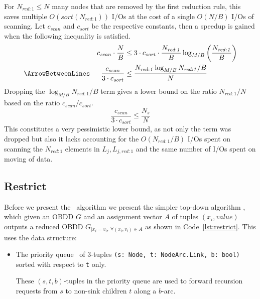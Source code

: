 For $N_{\mathit{red}:1} \leq N$ many nodes that are removed by the first
reduction rule, this saves multiple $O(sort(N_{\mathit{red:1}}))$ I/Os at the
cost of a single $O(N/B)$ I/Os of scanning. Let $c_{\mathit{scan}}$ and
$c_{\mathit{sort}}$ be the respective constants, then a speedup is gained when
the following inequality is satisfied.
\begin{alignat*}{2}
  &&c_{\mathit{scan}} \cdot \frac{N}{B}
  & \leq 3 \cdot c_{\mathit{sort}} \cdot \frac{N_{\mathit{red:1}}}{B}
           \log_{M/B} \left( \frac{N_{\mathit{red:1}}}{B} \right)
  \\ \ArrowBetweenLines
  &&\frac{c_{\mathit{scan}}}{3 \cdot c_{\mathit{sort}}}
  & \leq \frac{N_{\mathit{red:1}} \log_{M/B} N_{\mathit{red:1}} / B}{N}
\end{alignat*}
Dropping the $\log_{M/B} N_{\mathit{red:1}} / B$ term gives a lower bound on the
ratio $N_{\mathit{red:1}} / N$ based on the ratio $c_{\mathit{scan}} /
c_{\mathit{sort}}$.
\begin{equation}
    \frac{c_{\mathit{scan}}}{3 \cdot c_{\mathit{sort}}} \leq \frac{N_s}{N}
\end{equation}
This constitutes a very pessimistic lower bound, as not only the term was
dropped but also it lacks accounting for the $O(N_{\mathit{red:1}} / B)$ I/Os
spent on scanning the $N_{\mathit{red:1}}$ elements in $L_j,
L_{j,\mathit{red:1}}$ and the same number of I/Os spent on moving of data.


\clearpage
\subsection{Restrict} \label{sec:theory__restrict}
Before we present the \Apply\ algorithm we present the simpler top-down
algorithm \Restrict, which given an OBDD $G$ and an assignment vector $A$ of
tuples $(x_i, \mathit{value})$ outputs a reduced OBDD $G_{| x_i = v_i ,\ \forall
  (x_i,v_i) \in A}$ as shown in Code~\ref{lst:restrict}.  This uses the data
structure:

\begin{itemize}
\item The priority queue \RestrictQrec\ of 3-tuples
    \lstinline{(s: Node, t: NodeArc.Link, b: bool)} sorted with respect to
    \lstinline{t} only.

  These $(s,t,b)$-tuples in the priority queue are used to forward recursion
  requests from $s$ to non-sink children $t$ along a $b$-arc.
\end{itemize}

